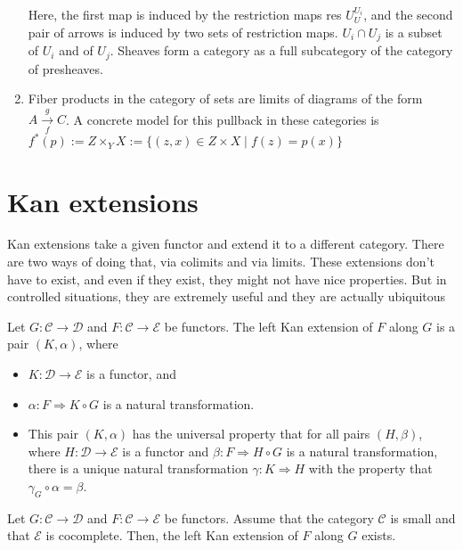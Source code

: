 \begin{example}
\begin{example}[Limits]
\begin{enumerate}
        Here, the first map is induced by the restriction maps res $U_U^{U_i}$, and the second pair of arrows is induced by two sets of restriction maps. $U_i \cap U_j$ is a subset of $U_i$ and of $U_j$.
        Sheaves form a category as a full subcategory of the category of presheaves.
        \item Fiber products in the category of sets are limits of diagrams of the form $A \underset{f}{\stackrel{g}{\longrightarrow}} C$. A concrete model for this pullback in these categories is $f^*(p):=Z \times_Y X:=\{(z, x) \in Z \times X \mid f(z)=p(x)\}$
    \end{enumerate}
\end{example}




\section{Kan extensions}

Kan extensions take a given functor and extend it to a different category. There are two ways of doing that, via colimits and via limits. These extensions don’t have to exist, and even if they exist, they might not have nice properties. But in controlled situations, they are extremely useful and they are actually ubiquitous

Let $G: \mathcal{C} \rightarrow \mathcal{D}$ and $F: \mathcal{C} \rightarrow \mathcal{E}$ be functors. The left Kan extension of $F$ along $G$ is a pair $(K, \alpha)$, where
\begin{itemize}
    \item $K: \mathcal{D} \rightarrow \mathcal{E}$ is a functor, and
    \item $\alpha: F \Rightarrow K \circ G$ is a natural transformation. %
    \item This pair $(K, \alpha)$ has the universal property that for all pairs $(H, \beta)$, where $H: \mathcal{D} \rightarrow \mathcal{E}$ is a functor and $\beta: F \Rightarrow H \circ G$ is a natural transformation, there is a unique natural transformation $\gamma: K \Rightarrow H$ with the property that $\gamma_G \circ \alpha=\beta$.
\end{itemize}

\begin{theo}
Let $G: \mathcal{C} \rightarrow \mathcal{D}$ and $F: \mathcal{C} \rightarrow \mathcal{E}$ be functors. Assume that the category $\mathcal{C}$ is small and that $\mathcal{E}$ is cocomplete. Then, the left Kan extension of $F$ along $G$ exists.
\end{theo}


\end{example}
